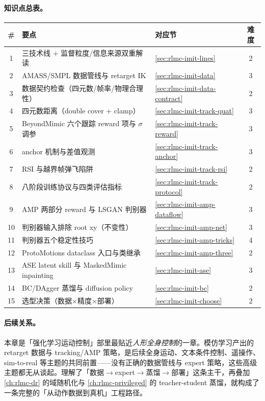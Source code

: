\paragraph{知识点总表。}
\begin{center}
\small
\begin{tabular}{@{}cllc@{}}
\toprule
\# & 要点 & 对应节 & 难度 \\
\midrule
1 & 三技术线 + 监督粒度/信息来源双重解读 & \cref{sec:rlmc-imit-lines} & 2 \\
2 & AMASS/SMPL 数据管线与 retarget IK & \cref{sec:rlmc-imit-data} & 3 \\
3 & 数据契约检查（四元数/帧率/物理合理性） & \cref{sec:rlmc-imit-data-contract} & 2 \\
4 & 四元数距离（double cover + clamp） & \cref{sec:rlmc-imit-track-quat} & 3 \\
5 & BeyondMimic 六个跟踪 reward 项与 $\sigma$ 调参 & \cref{sec:rlmc-imit-track-reward} & 3 \\
6 & anchor 机制与差值观测 & \cref{sec:rlmc-imit-track-anchor} & 3 \\
7 & RSI 与越界帧弹飞陷阱 & \cref{sec:rlmc-imit-track-rsi} & 2 \\
8 & 八阶段训练协议与四类评估指标 & \cref{sec:rlmc-imit-track-protocol} & 2 \\
9 & AMP 两部分 reward 与 LSGAN 判别器 & \cref{sec:rlmc-imit-amp-dataflow} & 3 \\
10 & 判别器输入排除 root xy（不变性） & \cref{sec:rlmc-imit-amp-net} & 3 \\
11 & 判别器五个稳定性技巧 & \cref{sec:rlmc-imit-amp-tricks} & 4 \\
12 & ProtoMotions dataclass 入口与类继承 & \cref{sec:rlmc-imit-amp-three} & 2 \\
13 & ASE latent skill 与 MaskedMimic inpainting & \cref{sec:rlmc-imit-ase} & 3 \\
14 & BC/DAgger 蒸馏与 diffusion policy & \cref{sec:rlmc-imit-bc} & 2 \\
15 & 选型决策（数据$\times$精度$\times$部署） & \cref{sec:rlmc-imit-choose} & 2 \\
\bottomrule
\end{tabular}
\end{center}

\paragraph{后续关系。}本章是「强化学习运动控制」部里最贴近\emph{人形全身控制}的一章。模仿学习产出的 retarget 数据与 tracking/AMP 策略，是后续全身运动、文本条件控制、遥操作、sim-to-real 等主题的共同前置——没有正确的数据管线与 expert 策略，这些高级主题都无从谈起。理解了「数据$\to$expert$\to$蒸馏$\to$部署」这条主干，再叠加 \cref{ch:rlmc-dr} 的域随机化与 \cref{ch:rlmc-privileged} 的 teacher-student 蒸馏，就构成了一条完整的「从动作数据到真机」工程路径。

